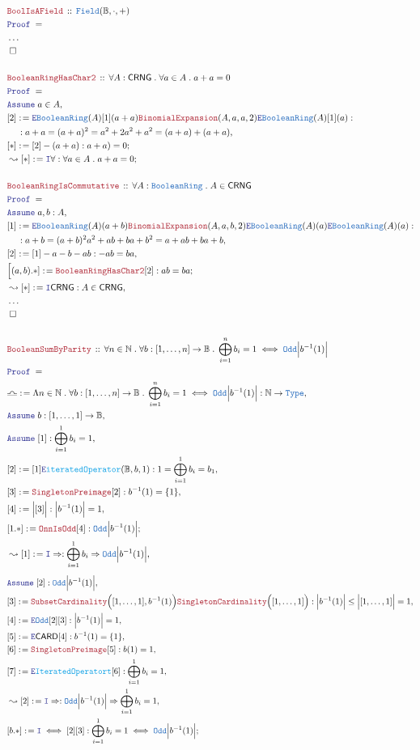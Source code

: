 \documentclass[12pt]{scrartcl}
\newcommand{\TYPE}[1]{\textcolor{NavyBlue}{\mathtt{#1}}}
\newcommand{\FUNC}[1]{\textcolor{Cerulean}{\mathtt{#1}}}
\newcommand{\LOGIC}[1]{\textcolor{Blue}{\mathtt{#1}}}
\newcommand{\THM}[1]{\textcolor{Maroon}{\mathtt{#1}}}
\renewcommand{\.}{\; . \;}
\newcommand{\de}{: \kern 0.1pc =}
\newcommand{\Theorem}[2]{& \THM{#1} \, :: \, #2 \\ & \Proof = \\ }
\newcommand{\NewLine}{\\ & \kern 1pc}
\newcommand{\Page}[1]{ \begin{align*} #1 \end{align*}   }
\newcommand{\NoProof}{ & \ldots \\ \EndProof}
\newcommand{\Imply}{\Rightarrow}
\newcommand{\Intro}{\LOGIC{I}}
\newcommand{\Elim}{\LOGIC{E}}
\newcommand{\Type}{\TYPE{Type}}
\newcommand{\Nat}{\mathbb{N} }
\newcommand{\Say}[3]{& #1 \de #2 : #3, \\}
\newcommand{\Conclude}[3]{& #1 \de #2 : #3; \\}
\newcommand{\Derive}[3]{& \leadsto #1 \de #2 : #3, \\}
\newcommand{\DeriveConclude}[3]{& \leadsto #1 \de #2 : #3 ; \\}
\newcommand{\Assume}[2]{& \LOGIC{Assume} \; #1 : #2, \\}
\newcommand{\AssumeIn}[2]{& \LOGIC{Assume} \; #1 \in #2, \\}
\newcommand{\QED}{\; \square}
\newcommand{\EndProof}{& \QED \\}
\newcommand{\Proof}{\LOGIC{Proof} \; }
\newcommand{\Field}{\TYPE{Field}}
\newcommand{\Bool}{\mathbb{B}}
\newcommand{\BR}{\TYPE{BooleanRing}}
\begin{document}
\Page{
	\Theorem{BoolIsAField}{\Field(\Bool,\cdot,+)}
	\NoProof
	\\
	\Theorem{BooleanRingHasChar2}
	{
		\forall A : \mathsf{CRNG} \.
		\forall a \in A \. a + a = 0
	}
	\AssumeIn{a}{A}
	\Say{[2]}{\Elim \BR(A)[1](a + a)\THM{BinomialExpansion}(A,a,a,2)\Elim \BR(A)[1](a)}
	{
		 \NewLine :
		 a + a =  
		 ( a + a)^2 =
		 a^2 + 2a^2 + a^2 = 
		 (a + a) + (a + a)
	}
	\Conclude{[*]}{[2] - (a + a)}{a + a) = 0}
	\DeriveConclude{[*]}{\Intro \forall}
	{
		\forall a \in A \. a + a = 0
	}
	\\
	\Theorem{BooleanRingIsCommutative}
	{
		\forall A : \BR \.
		A \in \mathsf{CRNG}
	}
	\Assume{a,b}{A}
	\Say{[1]}
	{
		\Elim \BR(A)(a + b)
		\THM{BinomialExpansion}(A,a,b,2)
		\Elim \BR(A)(a)
		\Elim \BR(A)(a)
	}
	{
	     \NewLine :
	     a + b = 
    	     (a + b)^2
	     a^2 + ab + ba + b^2 = 
	     a + ab + ba + b
	}
	\Say{[2]}{[1] - a - b - ab}{-ab = ba}
	\Conclude{\Big[(a,b).*]}{\THM{BooleanRingHasChar2}[2]}
	{
		ab = ba
	}
	\Derive{[*]}{\Intro \mathsf{CRNG}}{A \in \mathsf{CRNG}}
	\NoProof
	\\
	\Theorem{BooleanSumByParity}
	{
		\forall n \in \Nat \.
		\forall b : [1,\ldots,n] \to \Bool \.
		\bigoplus^n_{i=1} b_i = 1 \iff  \TYPE{Odd}\Big|b^{-1}(1)\Big|
	}
	\Say{\libra}
	{
		\Lambda n \in \Nat \. 
		\forall b : [1,\ldots,n] \to \Bool \.
		\bigoplus^n_{i=1} b_i = 1 \iff \TYPE{Odd}\Big| b^{-1}(1) \Big|
	}
	{
		\Nat \to \Type
	}
	\Assume{b}{[1,\ldots,1] \to \Bool}
	\Assume{[1]}{\bigoplus^1_{i=1} b_i = 1}
	\Say{[2]}{ [1]\Elim \FUNC{iteratedOperator}(\Bool,b,1) }
	{
		1 = \bigoplus^1_{i=1} b_i = b_1
	}
	\Say{[3]}{\THM{SingletonPreimage}[2]}{b^{-1}(1) = \{1\}}
	\Say{[4]}{\Big| [3] \Big|}{\Big| b^{-1}(1)\Big| = 1}
	\Conclude{[1.*]}{\THM{OnnIsOdd}[4]}{ \TYPE{Odd} \Big| b^{-1}(1)\Big| }
	\Derive{[1]}{\Intro \Imply}{ \bigoplus^1_{i=1} b_i \Imply \TYPE{Odd} \Big|b^{-1}(1) \Big|  }
}\Page{
	\Assume{[2]}{\TYPE{Odd} \Big| b^{-1}(1)\Big|}
	\Say{[3]}{
		\THM{SubsetCardinality}\Big([1,\ldots,1],b^{-1}(1)\Big)
		\THM{SingletonCardinality}\Big( [1,\ldots,1] \Big)
	}
	{
		\Big| b^{-1}(1)\Big| \le \Big| [1,\ldots,1] \Big| = 1
	}
	\Say{[4]}{\Elim \TYPE{Odd}[2][3]}
	{
		\Big| b^{-1}(1) \Big| = 1
	}
	\Say{[5]}{\Elim \mathsf{CARD}[4]}{b^{-1}(1)=\{1\}}
	\Say{[6]}{\THM{SingletonPreimage}[5]}{b(1) = 1}
	\Say{[7]}{\Elim \FUNC{IteratedOperatort}[6]}{ \bigoplus^1_{i=1} b_i = 1}
	\Derive{[2]}{\Intro \Imply}
	{
		\TYPE{Odd}\Big| b^{-1}(1) \Big| \Imply \bigoplus^1_{i=1} b_i = 1
	}
	\Conclude{[b.*]}{ \Intro \iff [2][3]    }
	{
		\bigoplus^1_{i=1} b_i = 1 \iff \TYPE{Odd}\Big| b^{-1}(1) \Big| 
	}
}
\end{document}

